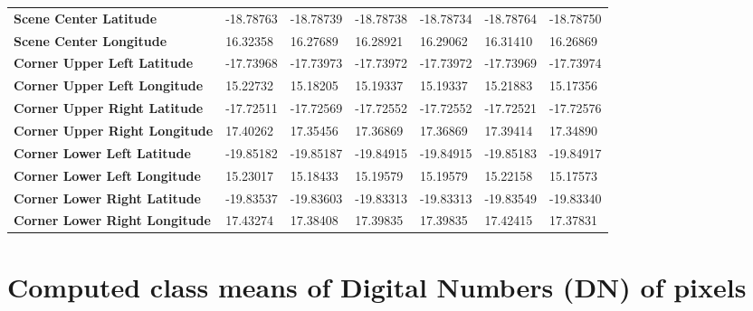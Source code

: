 \documentclass[climate,article,submit,pdftex,moreauthors]{Definitions/mdpi}
\begin{document}
\begin{landscape}
\begin{table}
\begin{tabular}{|l|l|l|l|l|l|l|}
        \textbf{Scene Center Latitude} & -18.78763 & -18.78739 & -18.78738 & -18.78734 & -18.78764 & -18.78750 \\
        \textbf{Scene Center Longitude} & 16.32358 & 16.27689 & 16.28921 & 16.29062 & 16.31410 & 16.26869 \\
        \textbf{Corner Upper Left Latitude} & -17.73968 & -17.73973 & -17.73972 & -17.73972 & -17.73969 & -17.73974 \\
        \textbf{Corner Upper Left Longitude} & 15.22732 & 15.18205 & 15.19337 & 15.19337 & 15.21883 & 15.17356 \\
        \textbf{Corner Upper Right Latitude} & -17.72511 & -17.72569 & -17.72552 & -17.72552 & -17.72521 & -17.72576 \\
        \textbf{Corner Upper Right Longitude} & 17.40262 & 17.35456 & 17.36869 & 17.36869 & 17.39414 & 17.34890 \\
        \textbf{Corner Lower Left Latitude} & -19.85182 & -19.85187 & -19.84915 & -19.84915 & -19.85183 & -19.84917 \\
        \textbf{Corner Lower Left Longitude} & 15.23017 & 15.18433 & 15.19579 & 15.19579 & 15.22158 & 15.17573 \\
        \textbf{Corner Lower Right Latitude} & -19.83537 & -19.83603 & -19.83313 & -19.83313 & -19.83549 & -19.83340 \\
        \textbf{Corner Lower Right Longitude} & 17.43274 & 17.38408 & 17.39835 & 17.39835 & 17.42415 & 17.37831 \\
    \end{tabular}%
\end{table}
 \end{landscape}

\section[\appendixname~\thesection]{Computed class means of Digital Numbers (DN) of pixels}
\end{document}

